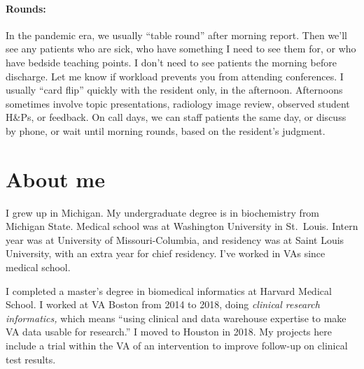 \documentclass{tufte-handout}
\begin{document}
\paragraph{Rounds:} In the pandemic era, we usually ``table
round'' after morning report. Then we'll see any patients who are
sick, who have something I need to see them for, or who have bedside
teaching points. I don't need to see patients the morning before
discharge. Let me know if workload prevents you from attending
conferences. I usually ``card flip'' quickly with the resident only,
in the afternoon. Afternoons sometimes involve topic presentations,
radiology image review, observed student H\&Ps, or feedback. On call
days, we can staff patients the same day, or discuss by phone, or wait
until morning rounds, based on the resident's judgment.

\section{About me}

I grew up in Michigan. My undergraduate degree is in biochemistry from
Michigan State. Medical school was at Washington University in
St.\ Louis. Intern year was at University of Missouri-Columbia, and
residency was at Saint Louis University, with an extra year for chief
residency. I've worked in VAs since medical school.


I completed a master's degree in biomedical informatics at Harvard
Medical School. I worked at VA Boston from 2014 to 2018, doing
\emph{clinical research informatics,} which means ``using clinical and
data warehouse expertise to make VA data usable for
research.'' I moved to Houston in 2018. My projects here
include a trial within the VA of an intervention to improve follow-up
on clinical test results.
\end{document}
